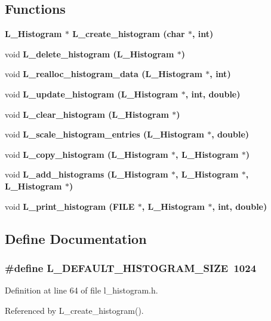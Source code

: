 \subsection*{Functions}
\begin{CompactItemize}
\item 
\bf{L\_\-Histogram} $\ast$ \bf{L\_\-create\_\-histogram} (char $\ast$, int)
\item 
void \bf{L\_\-delete\_\-histogram} (\bf{L\_\-Histogram} $\ast$)
\item 
void \bf{L\_\-realloc\_\-histogram\_\-data} (\bf{L\_\-Histogram} $\ast$, int)
\item 
void \bf{L\_\-update\_\-histogram} (\bf{L\_\-Histogram} $\ast$, int, double)
\item 
void \bf{L\_\-clear\_\-histogram} (\bf{L\_\-Histogram} $\ast$)
\item 
void \bf{L\_\-scale\_\-histogram\_\-entries} (\bf{L\_\-Histogram} $\ast$, double)
\item 
void \bf{L\_\-copy\_\-histogram} (\bf{L\_\-Histogram} $\ast$, \bf{L\_\-Histogram} $\ast$)
\item 
void \bf{L\_\-add\_\-histograms} (\bf{L\_\-Histogram} $\ast$, \bf{L\_\-Histogram} $\ast$, \bf{L\_\-Histogram} $\ast$)
\item 
void \bf{L\_\-print\_\-histogram} (FILE $\ast$, \bf{L\_\-Histogram} $\ast$, int, double)
\end{CompactItemize}


\subsection{Define Documentation}
\subsubsection{\setlength{\rightskip}{0pt plus 5cm}\#define L\_\-DEFAULT\_\-HISTOGRAM\_\-SIZE~1024}\label{l__histogram_8h_771a4827111643030914cee7ad28e103}




Definition at line 64 of file l\_\-histogram.h.

Referenced by L\_\-create\_\-histogram().
